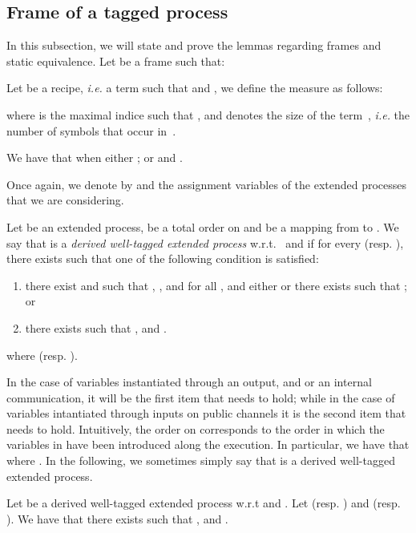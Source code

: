 \subsection{Frame of a tagged process}
\label{subset: frame flagged process}

In this subsection, we will state and prove the lemmas regarding
frames and static equivalence.
Let  be a frame such that:

Let  be a recipe, \emph{i.e.} a term such that  and , we define the measure  as follows:
 
where  is the maximal indice  such that
, and  denotes the size of the term~, \emph{i.e.} the number of
symbols that occur in~.

We have that  when
either ;
or  and .

Once again, we denote by  and  the assignment variables of the extended processes that we are considering. 









\begin{definition}
 Let  be an extended process,  be a total order on  and  be a mapping from  to . We say that   is a \emph{derived well-tagged extended process} w.r.t.~ and  if for every  (resp. ), there exists  such that one of the following condition is
satisfied:
\begin{enumerate}
\item there exist  and  such that
  , , and for all ,  and either  or there exists  such that ; or
\item there exists  such that ,  and
    .
\end{enumerate}
where  (resp. ). 
\end{definition}

{In the case of variables instantiated through an output, and or an internal communication, it will be the first item that needs to hold; while in the case of variables intantiated through inputs on public channels it is the second item that needs to hold.} Intuitively, the order  on  corresponds to the order in which the variables in  have been introduced along the execution. In particular, we have that  where . In the following, we sometimes simply say that  is a derived well-tagged extended process.







\begin{lemma}
  \label{lem:Flawedandframeelement}
  Let  be a derived well-tagged extended process w.r.t  and . Let  (resp. ) and  (resp. ). We have that there exists  such that ,  and .
\end{lemma}

